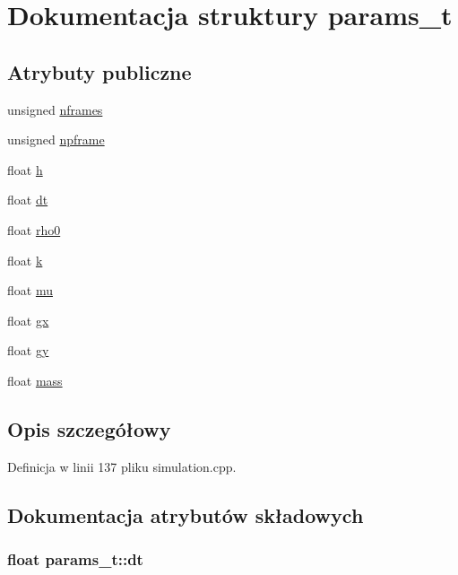 \hypertarget{structparams__t}{\section{Dokumentacja struktury params\-\_\-t}
\label{structparams__t}
}
\subsection*{Atrybuty publiczne}
\begin{DoxyCompactItemize}
\item 
unsigned \hyperlink{structparams__t_a2cecc28f4ca024657cf567047e2aba59}{nframes}
\item 
unsigned \hyperlink{structparams__t_a06a1a567fd5ba13905514227e2bb710a}{npframe}
\item 
float \hyperlink{structparams__t_a27d76064f2ae0cb93a0956027cfcc19b}{h}
\item 
float \hyperlink{structparams__t_a81fc6596e9b1446442ebf3eef2c3fb01}{dt}
\item 
float \hyperlink{structparams__t_a2eb309edb681d0a998f23fc692a73781}{rho0}
\item 
float \hyperlink{structparams__t_a97ee2783cf89cee1151be3250e9054b3}{k}
\item 
float \hyperlink{structparams__t_a971359c29b2f946b477e4a1b3605fa3f}{mu}
\item 
float \hyperlink{structparams__t_a9f3f70c0cdedcb053c9d45c2e41e67b6}{gx}
\item 
float \hyperlink{structparams__t_a0da484b4cc6a542875aa7b92e200f507}{gy}
\item 
float \hyperlink{structparams__t_afe4a59fe43565a71a0a7a155714e2af1}{mass}
\end{DoxyCompactItemize}


\subsection{Opis szczegółowy}


Definicja w linii 137 pliku simulation.\-cpp.



\subsection{Dokumentacja atrybutów składowych}
\hypertarget{structparams__t_a81fc6596e9b1446442ebf3eef2c3fb01}{
\subsubsection[{dt}]{\setlength{\rightskip}{0pt plus 5cm}float params\-\_\-t\-::dt}}\label{structparams__t_a81fc6596e9b1446442ebf3eef2c3fb01}



